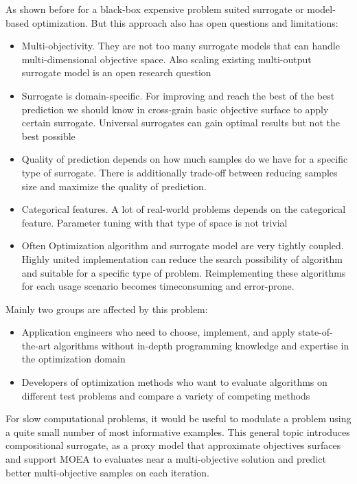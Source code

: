     As shown before for a black-box expensive problem suited surrogate or model-based optimization. But this approach also has open questions and limitations:
    \begin{itemize}
        \item Multi-objectivity. They are not too many surrogate models that can handle multi-dimensional objective space. Also scaling existing multi-output surrogate model is an open research question
        \item Surrogate is domain-specific. For improving and reach the best of the best prediction we should know in cross-grain basic objective surface to apply certain surrogate. Universal surrogates can gain optimal results but not the best possible
        \item Quality of prediction depends on how much samples do we have for a specific type of surrogate. There is additionally trade-off between reducing samples size and maximize the quality of prediction.
        \item Categorical features. A lot of real-world problems depends on the categorical feature. Parameter tuning with that type of space is not trivial
        \item Often Optimization algorithm and surrogate model are very tightly coupled. Highly united implementation can reduce the search possibility of algorithm and suitable for a specific type of problem. Reimplementing these algorithms for each usage scenario becomes timeconsuming and error-prone.
    \end{itemize}

    Mainly two groups are affected by this problem:
    \begin{itemize}
        \item Application engineers who need to choose, implement, and apply state-of- the-art algorithms without in-depth programming knowledge and expertise in the optimization domain
        \item Developers of optimization methods who want to evaluate algorithms on different test problems and compare a variety of competing methods
    \end{itemize}

    For slow computational problems, it would be useful to modulate a problem using a quite small number of most informative examples. This general topic introduces compositional surrogate, as a proxy model that approximate objectives surfaces and support MOEA to evaluates near a multi-objective solution and predict better multi-objective samples on each iteration.


